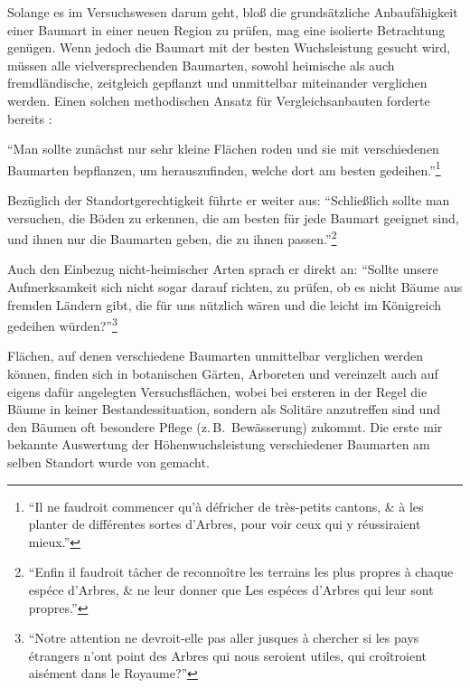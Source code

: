 \documentclass[twocolumn]{scrartcl}
\begin{document}
Solange es im Versuchswesen darum geht, bloß die grundsätzliche Anbaufähigkeit einer 
Baumart in einer neuen Region zu prüfen, mag eine isolierte Betrachtung genügen. Wenn 
jedoch die Baumart mit der besten Wuchsleistung gesucht wird, müssen alle vielversprechenden 
Baumarten, sowohl heimische als auch fremdländische, zeitgleich gepflanzt und unmittelbar 
miteinander verglichen werden. Einen solchen methodischen Ansatz für Vergleichsanbauten 
forderte bereits \citet[S.~300]{reaumur1721ertragstafel}: 

\enquote{Man sollte zunächst nur sehr kleine Flächen roden und sie mit verschiedenen 
Baumarten bepflanzen, um herauszufinden, welche dort am besten gedeihen.}\footnote{\enquote{Il 
ne faudroit commencer qu’à défricher de très-petits cantons, \& à les planter de différentes 
sortes d'Arbres, pour voir ceux qui y réussiraient mieux.}} 

Bezüglich der Standortgerechtigkeit führte er weiter aus: 
\enquote{Schließlich sollte man versuchen, die Böden zu erkennen, die am besten für jede 
Baumart geeignet sind, und ihnen nur die Baumarten geben, die zu ihnen passen.}\footnote{\enquote{Enfin 
il faudroit tâcher de reconnoître les terrains les plus propres à chaque espéce d’Arbres, 
\& ne leur donner que Les espéces d’Arbres qui leur sont propres.}} 

Auch den Einbezug nicht-heimischer Arten sprach er direkt an: 
\enquote{Sollte unsere Aufmerksamkeit sich nicht sogar darauf richten, zu prüfen, ob es nicht 
Bäume aus fremden Ländern gibt, die für uns nützlich wären und die leicht im Königreich 
gedeihen würden?}\footnote{\enquote{Notre attention ne devroit-elle pas aller jusques à 
chercher si les pays étrangers n'ont point des Arbres qui nous seroient utiles, qui 
croîtroient aisément dans le Royaume?}}

Flächen, auf denen verschiedene Baumarten
unmittelbar verglichen werden können, finden sich in botanischen Gärten,
Arboreten und vereinzelt auch auf eigens dafür angelegten Versuchsflächen, wobei
bei ersteren in der Regel die Bäume in keiner Bestandessituation, sondern als
Solitäre anzutreffen sind und den Bäumen oft besondere Pflege (z.\,B.\
Bewässerung) zukommt. Die erste mir bekannte Auswertung der
Höhenwuchsleistung verschiedener Baumarten am selben Standort wurde von
\cite{mayer1970anbauversuch} gemacht.
\end{document}
